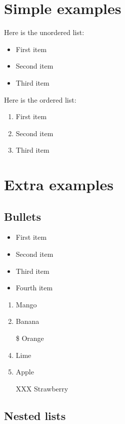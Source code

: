 \documentclass[12pt]{article}
\begin{document}
\section{Simple examples}

Here is the unordered list:
\begin{itemize}
    \item First item
    \item Second item
    \item Third item
\end{itemize}

Here is the ordered list:
\begin{enumerate}
    \item First item
    \item Second item
    \item Third item
\end{enumerate}



\section{Extra examples}

\subsection{Bullets}

\begin{itemize}[label={\large\textbullet}]
    \item First item
    \item Second item
    \item Third item
    \item Fourth item
\end{itemize}

\vspace{4mm}

\begin{enumerate}
    \item Mango
    \item Banana
    \item[\$] Orange
    \item Lime
    \item Apple
    \item[XXX] Strawberry
\end{enumerate}

\subsection{Nested lists}
\end{document}
